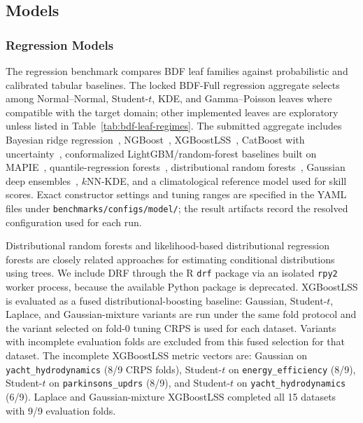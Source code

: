 \subsection{Models}\label{app:experimental-setup-models}

\subsubsection{Regression Models}\label{app:experimental-setup-reg-models}
The regression benchmark compares BDF leaf families against probabilistic and calibrated tabular baselines. The locked BDF-Full regression aggregate selects among Normal--Normal, Student-$t$, KDE, and Gamma--Poisson leaves where compatible with the target domain; other implemented leaves are exploratory unless listed in Table~\ref{tab:bdf-leaf-regimes}. The submitted aggregate includes Bayesian ridge regression~\citep{bishop2006pattern}, NGBoost~\citep{duan2020ngboost}, XGBoostLSS~\citep{marz2019xgboostlss}, CatBoost with uncertainty~\citep{dorogush2018catboost,malinin2021uncertainty}, conformalized LightGBM/random-forest baselines built on MAPIE~\citep{taquet2022mapie}, quantile-regression forests~\citep{meinshausen2006quantile}, distributional random forests~\citep{cevid2022distributional}, Gaussian deep ensembles~\citep{lakshminarayanan2017simple}, $k$NN-KDE, and a climatological reference model used for skill scores. Exact constructor settings and tuning ranges are specified in the YAML files under \texttt{benchmarks/configs/model/}; the result artifacts record the resolved configuration used for each run.

Distributional random forests and likelihood-based distributional regression forests are closely related approaches for estimating conditional distributions using trees. We include DRF through the R \texttt{drf} package via an isolated \texttt{rpy2} worker process, because the available Python package is deprecated. XGBoostLSS is evaluated as a fused distributional-boosting baseline: Gaussian, Student-$t$, Laplace, and Gaussian-mixture variants are run under the same fold protocol and the variant selected on fold-0 tuning CRPS is used for each dataset. Variants with incomplete evaluation folds are excluded from this fused selection for that dataset. The incomplete XGBoostLSS metric vectors are: Gaussian on \texttt{yacht\_hydrodynamics} (8/9 CRPS folds), Student-$t$ on \texttt{energy\_efficiency} (8/9), Student-$t$ on \texttt{parkinsons\_updrs} (8/9), and Student-$t$ on \texttt{yacht\_hydrodynamics} (6/9). Laplace and Gaussian-mixture XGBoostLSS completed all 15 datasets with 9/9 evaluation folds.

